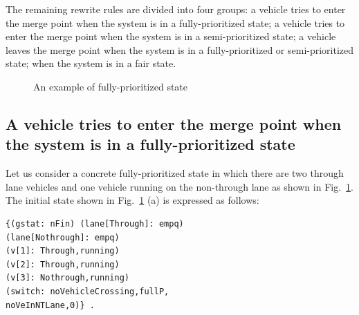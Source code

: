 \documentclass[10pt, conference, compsocconf]{IEEEtran}
\begin{document}
The remaining rewrite rules are divided into four groups: a vehicle tries to enter the merge point when the system is in a fully-prioritized state; a vehicle tries to enter the merge point when the system is in a semi-prioritized state; a vehicle leaves the merge point when the system is in a fully-prioritized or semi-prioritized state;
when the system is in a fair state.
	
\begin{figure}[tb]
\begin{center}
\end{center}
\caption{An example of fully-prioritized state}
\label{fully_fig}
\end{figure}

\subsection{A vehicle tries to enter the merge point when the system is in a fully-prioritized state}

Let us consider a concrete fully-prioritized state in which there are two through lane vehicles and one vehicle running on the non-through lane as shown in Fig.~\ref{fully_fig}. 
The initial state shown in Fig.~\ref{fully_fig} (a) is expressed as follows:
 
\begin{small}
\begin{verbatim}
{(gstat: nFin) (lane[Through]: empq) 
(lane[Nothrough]: empq) 
(v[1]: Through,running) 
(v[2]: Through,running)
(v[3]: Nothrough,running)
(switch: noVehicleCrossing,fullP,
noVeInNTLane,0)} .
\end{verbatim}
\end{small}
\end{document}
